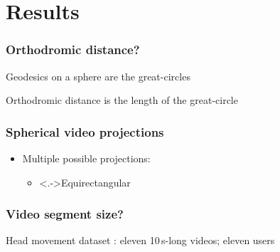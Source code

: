 \section{Results}

\begin{frame}[c]
   \frametitle{Orthodromic distance?}

   Geodesics on a sphere are the great-circles

   Orthodromic distance is the length of the great-circle

   \begin{independentCounter}
      \begin{center}
         
      \end{center}
   \end{independentCounter}

\end{frame}

\begin{frame}[c]
   \frametitle{Spherical video projections}

   \vfill

   \begin{itemize}
      \item<+-> Multiple possible projections:
      \begin{itemize}
         \item \uncover<.->{Equirectangular}
      \end{itemize}
   \end{itemize}

   \vfill

   \begin{independentCounter}
      \begin{center}
         
      \end{center}
   \end{independentCounter}

\end{frame}

\begin{frame}[c]
   \frametitle{Video segment size?}
   Head movement dataset
   : eleven 10\,s-long videos; eleven users%
   \vspace{-0.4cm}
   \begin{independentCounter}
   \end{independentCounter}
\end{frame}

